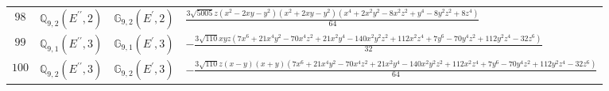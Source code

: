 \documentclass[fleqn,8pt,landscape]{jsarticle}
\begin{document}
\begin{table}[ht!]
\begin{center}
\begin{tabular}{cccl}
$ 98 $ & $ \mathbb{Q}_{9,2}(E^{\prime\prime},2) $ & $ \mathbb{G}_{9,2}(E^{\prime},2) $ & $ \frac{3 \sqrt{5005} z \left(x^{2} - 2 x y - y^{2}\right) \left(x^{2} + 2 x y - y^{2}\right) \left(x^{4} + 2 x^{2} y^{2} - 8 x^{2} z^{2} + y^{4} - 8 y^{2} z^{2} + 8 z^{4}\right)}{64} $ \\
$ 99 $ & $ \mathbb{Q}_{9,1}(E^{\prime\prime},3) $ & $ \mathbb{G}_{9,1}(E^{\prime},3) $ & $ - \frac{3 \sqrt{110} x y z \left(7 x^{6} + 21 x^{4} y^{2} - 70 x^{4} z^{2} + 21 x^{2} y^{4} - 140 x^{2} y^{2} z^{2} + 112 x^{2} z^{4} + 7 y^{6} - 70 y^{4} z^{2} + 112 y^{2} z^{4} - 32 z^{6}\right)}{32} $ \\
$ 100 $ & $ \mathbb{Q}_{9,2}(E^{\prime\prime},3) $ & $ \mathbb{G}_{9,2}(E^{\prime},3) $ & $ - \frac{3 \sqrt{110} z \left(x - y\right) \left(x + y\right) \left(7 x^{6} + 21 x^{4} y^{2} - 70 x^{4} z^{2} + 21 x^{2} y^{4} - 140 x^{2} y^{2} z^{2} + 112 x^{2} z^{4} + 7 y^{6} - 70 y^{4} z^{2} + 112 y^{2} z^{4} - 32 z^{6}\right)}{64} $ \\
 \hline \hline
\end{tabular}
\end{center}
\end{table}
\end{document}
